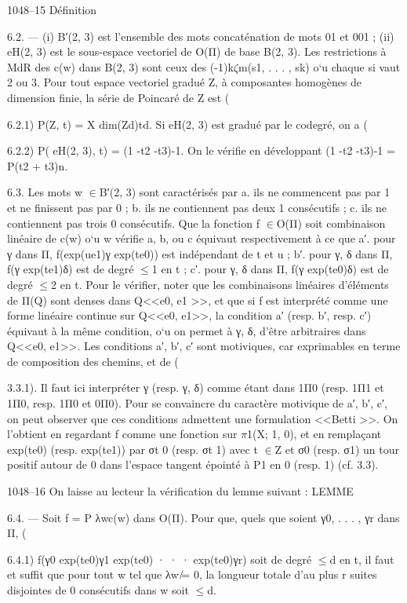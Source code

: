 \documentclass[11pt]{article}
\begin{document}
1048--15 Définition 

6.2. --- (i) B′(2, 3) est l’ensemble des mots concaténation de mots 01 et 001 ; (ii) eH(2, 3) est le sous-espace vectoriel de O(Π) de base B(2, 3). Les restrictions à MdR des c(w) dans B(2, 3) sont ceux des (-1)k\(\zeta\)m(s1, . . . , sk) o`u chaque si vaut 2 ou 3. Pour tout espace vectoriel gradué Z, à composantes homogènes de dimension finie, la série de Poincaré de Z est (

6.2.1) P(Z, t) = X dim(Zd)td. Si eH(2, 3) est gradué par le codegré, on a (

6.2.2) P( eH(2, 3), t) = (1 -t2 -t3)-1. On le vérifie en développant (1 -t2 -t3)-1 = P(t2 + t3)n. 

6.3. Les mots w \(\in\)B′(2, 3) sont caractérisés par a. ils ne commencent pas par 1 et ne finissent pas par 0 ; b. ils ne contiennent pas deux 1 consécutifs ; c. ils ne contiennent pas trois 0 consécutifs. Que la fonction f \(\in\)O(Π) soit combinaison linéaire de c(w) o`u w vérifie a, b, ou c équivaut respectivement à ce que a′. pour γ dans Π, f(exp(ue1)γ exp(te0)) est indépendant de t et u ; b′. pour γ, δ dans Π, f(γ exp(te1)δ) est de degré \(\le\)1 en t ; c′. pour γ, δ dans Π, f(γ exp(te0)δ) est de degré \(\le\)2 en t. Pour le vérifier, noter que les combinaisons linéaires d’éléments de Π(Q) sont denses dans Q<<e0, e1 >>, et que si f est interprété comme une forme linéaire continue sur Q<<e0, e1>>, la condition a′ (resp. b′, resp. c′) équivaut à la même condition, o`u on permet à γ, δ, d’être arbitraires dans Q<<e0, e1>>. Les conditions a′, b′, c′ sont motiviques, car exprimables en terme de composition des chemins, et de (

3.3.1). Il faut ici interpréter γ (resp. γ, δ) comme étant dans 1Π0 (resp. 1Π1 et 1Π0, resp. 1Π0 et 0Π0). Pour se convaincre du caractère motivique de a′, b′, c′, on peut observer que ces conditions admettent une formulation <<Betti >>. On l’obtient en regardant f comme une fonction sur \(\pi\)1(X; 1, 0), et en remplaçant exp(te0) (resp. exp(te1)) par σt 0 (resp. σt 1) avec t \(\in\)Z et σ0 (resp. σ1) un tour positif autour de 0 dans l’espace tangent épointé à P1 en 0 (resp. 1) (cf. 3.3).

1048--16 On laisse au lecteur la vérification du lemme suivant : LEMME 

6.4. --- Soit f = P λwc(w) dans O(Π). Pour que, quels que soient γ0, . . . , γr dans Π, (

6.4.1) f(γ0 exp(te0)γ1 exp(te0) · · · exp(te0)γr) soit de degré \(\le\)d en t, il faut et suffit que pour tout w tel que λw ̸= 0, la longueur totale d’au plus r suites disjointes de 0 consécutifs dans w soit \(\le\)d. 
\end{document}
